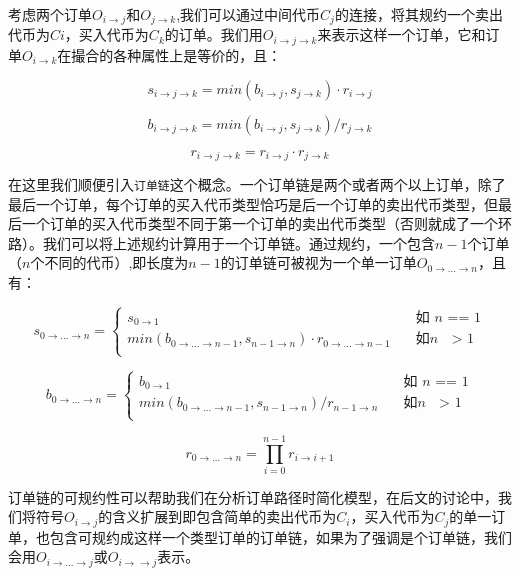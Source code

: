\documentclass[UTF8,nofonts]{ctexart}
\begin{document}
考虑两个订单$O_{i\rightarrow j}$和$O_{j\rightarrow k}$,我们可以通过中间代币$C_j$的连接，将其规约一个卖出代币为$Ci$，买入代币为$C_k$的订单。我们用$O_{i\rightarrow j\rightarrow k}$来表示这样一个订单，它和订单$O_{i\rightarrow k}$在撮合的各种属性上是等价的，且：

\begin{equation}
s_{i\rightarrow j\rightarrow k}=min(b_{i\rightarrow j},s_{j\rightarrow k}) \cdot r_{i\rightarrow j}
\end{equation}

\begin{equation}
b_{i\rightarrow j\rightarrow k}=min(b_{i\rightarrow j},s_{j\rightarrow k}) / r_{j\rightarrow k}
\end{equation}

\begin{equation}
r_{i\rightarrow j\rightarrow k}= r_{i\rightarrow j}\cdot r_{j\rightarrow k}
\end{equation}


在这里我们顺便引入\texttt{订单链}这个概念。一个订单链是两个或者两个以上订单，除了最后一个订单，每个订单的买入代币类型恰巧是后一个订单的卖出代币类型，但最后一个订单的买入代币类型不同于第一个订单的卖出代币类型（否则就成了一个环路）。我们可以将上述规约计算用于一个订单链。通过规约，一个包含$n-1$个订单（$n$个不同的代币）,即长度为$n-1$的订单链可被视为一个单一订单$O_{0\rightarrow ...\rightarrow n}$，且有：

\[ s_{0\rightarrow ...\rightarrow n} =
  \begin{cases}
    s_{0\rightarrow 1}      & \quad \text{如 } n \text{ == 1}\\
    min(b_{0\rightarrow ...\rightarrow n-1},s_{n-1\rightarrow n}) \cdot r_{0\rightarrow ...\rightarrow n-1}  & \quad \text{如} n \text{ $>$ 1}\\
  \end{cases}
\]

\[ b_{0\rightarrow ...\rightarrow n} =
  \begin{cases}
    b_{0\rightarrow 1}      & \quad \text{如 } n \text{ == 1}\\
    min(b_{0\rightarrow ...\rightarrow n-1},s_{n-1\rightarrow n}) / r_{n-1\rightarrow n}  & \quad \text{如} n \text{ $>$ 1}\\
  \end{cases}
\]


\[ r_{0\rightarrow ...\rightarrow n} = \prod_{i=0}^{n-1}{r_{i\rightarrow i+1}}
\]


订单链的可规约性可以帮助我们在分析订单路径时简化模型，在后文的讨论中，我们将符号$O_{i \rightarrow j}$的含义扩展到即包含简单的卖出代币为$C_i$，买入代币为$C_j$的单一订单，也包含可规约成这样一个类型订单的订单链，如果为了强调是个订单链，我们会用$O_{i \rightarrow ...\rightarrow j}$或$O_{i \rightarrow \rightarrow j}$表示。
\end{document}
